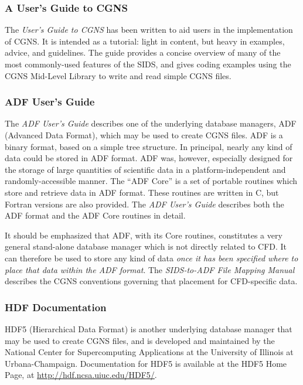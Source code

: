 \subsubsection{A User's Guide to CGNS}

The \textit{User's Guide to CGNS} has been written to aid users in the
implementation of CGNS.
It is intended as a tutorial: light in content, but heavy in examples,
advice, and guidelines.
The guide provides a concise overview of many of the most commonly-used
features of the SIDS, and gives coding examples using the CGNS Mid-Level
Library to write and read simple CGNS files.

\subsubsection{ADF User's Guide}

The \textit{ADF User's Guide} describes
one of the underlying database managers, ADF (Advanced Data Format),
which may be used to create CGNS files.
ADF is a binary format, based on a simple tree structure.
In principal, nearly any kind of data could be stored in ADF format.
ADF was, however, especially designed for the storage of large
quantities of scientific data in a platform-independent and
randomly-accessible manner.
The ``ADF Core'' is a set of portable routines which store and retrieve
data in ADF format.
These
routines are written in C, but Fortran versions are also provided.
The \textit{ADF User's Guide} describes both the ADF format and the ADF Core
routines in detail.

It should be emphasized that ADF, with its Core routines, constitutes a
very general stand-alone database manager which is not directly related
to CFD. It can therefore be used to store any kind of data \emph{once it has
been specified where to place that data within the ADF format}.
The \textit{SIDS-to-ADF File Mapping Manual} describes the CGNS
conventions governing that placement for CFD-specific data.

\subsubsection{HDF Documentation}

HDF5 (Hierarchical Data Format) is another underlying database manager
that may be used to create CGNS files, and is developed and maintained
by the National Center for Supercomputing Applications at the University
of Illinois at Urbana-Champaign.
Documentation for HDF5 is available at the HDF5 Home Page, at
\url{http://hdf.ncsa.uiuc.edu/HDF5/}.

